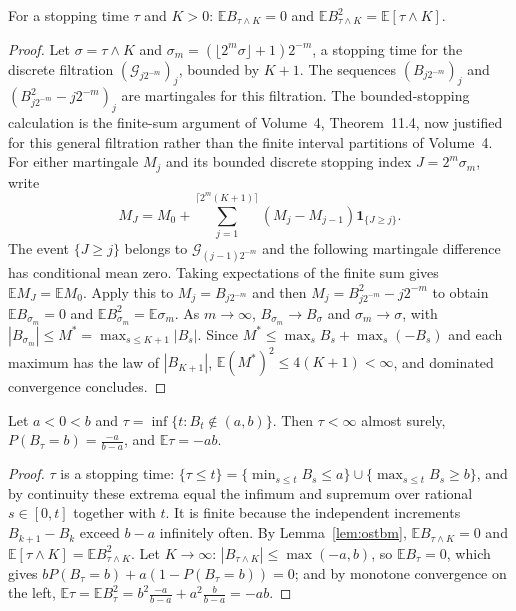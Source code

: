 \begin{lemma}\label{lem:ostbm}
For a stopping time $\tau$ and $K>0$: $\mathbb E B_{\tau\wedge K}=0$ and $\mathbb E B_{\tau\wedge K}^2=\mathbb E[\tau\wedge K]$.
\end{lemma}
\begin{proof}
Let $\sigma=\tau\wedge K$ and $\sigma_m=(\lfloor2^m\sigma\rfloor+1)2^{-m}$, a stopping time for the discrete filtration $(\mathcal G_{j2^{-m}})_j$, bounded by $K+1$.
The sequences $(B_{j2^{-m}})_j$ and $(B_{j2^{-m}}^2-j2^{-m})_j$ are martingales for this filtration. The bounded-stopping calculation is the finite-sum argument of Volume~4, Theorem~11.4, now justified for this general filtration rather than the finite interval partitions of Volume~4. For either martingale $M_j$ and its bounded discrete stopping index $J=2^m\sigma_m$, write
\[
M_J=M_0+\sum_{j=1}^{\lceil 2^m(K+1)\rceil}(M_j-M_{j-1})\mathbf1_{\{J\ge j\}}.
\]
The event $\{J\ge j\}$ belongs to $\mathcal G_{(j-1)2^{-m}}$ and the following martingale difference has conditional mean zero. Taking expectations of the finite sum gives $\mathbb E M_J=\mathbb E M_0$. Apply this to $M_j=B_{j2^{-m}}$ and then $M_j=B_{j2^{-m}}^2-j2^{-m}$ to obtain $\mathbb E B_{\sigma_m}=0$ and $\mathbb E B_{\sigma_m}^2=\mathbb E\sigma_m$. As $m\to\infty$, $B_{\sigma_m}\to B_\sigma$ and $\sigma_m\to\sigma$, with $|B_{\sigma_m}|\le M^*=\max_{s\le K+1}|B_s|$.
Since $M^*\le\max_sB_s+\max_s(-B_s)$ and each maximum has the law of $|B_{K+1}|$, $\mathbb E(M^*)^2\le4(K+1)<\infty$, and dominated convergence concludes.
\end{proof}

\begin{proposition}\label{prop:exit}
Let $a<0<b$ and $\tau=\inf\{t:B_t\notin(a,b)\}$. Then $\tau<\infty$ almost surely, $P(B_\tau=b)=\frac{-a}{b-a}$, and $\mathbb E\tau=-ab$.
\end{proposition}
\begin{proof}
$\tau$ is a stopping time: $\{\tau\le t\}=\{\min_{s\le t}B_s\le a\}\cup\{\max_{s\le t}B_s\ge b\}$, and by continuity these extrema equal the infimum and supremum over rational $s\in[0,t]$ together with $t$. It is
finite because the independent increments $B_{k+1}-B_k$ exceed $b-a$ infinitely often. By Lemma~\ref{lem:ostbm}, $\mathbb E B_{\tau\wedge K}=0$ and $\mathbb E[\tau\wedge K]=\mathbb E
B_{\tau\wedge K}^2$. Let $K\to\infty$: $|B_{\tau\wedge K}|\le\max(-a,b)$, so $\mathbb E B_\tau=0$, which gives $bP(B_\tau=b)+a(1-P(B_\tau=b))=0$; and by monotone convergence on the left,
$\mathbb E\tau=\mathbb E B_\tau^2=b^2\frac{-a}{b-a}+a^2\frac b{b-a}=-ab$.
\end{proof}


